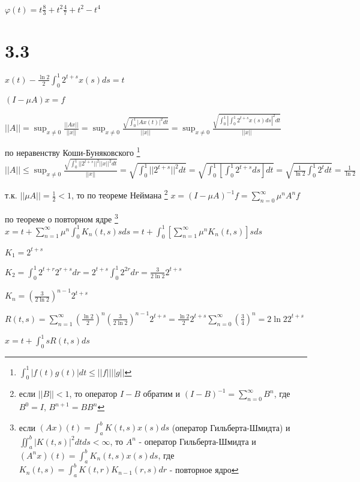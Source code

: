 \documentclass[russian]{article}
\begin{document}
$\varphi(t) = t \frac{8}{3} + t^2 \frac{4}{7} + t^2 - t^4$

\section*{3.3}

$x(t) - \frac{\ln 2}{2}\int_0^1 2^{t+s} x(s) ds = t$

$(I-\mu A)x = f$

$||A||=\sup_{x \ne 0} \frac{||Ax||}{||x||} = \sup_{x \ne 0} \frac{\sqrt{\int_0^1 |Ax(t)|^2 dt}}{||x||}=\sup_{x \ne 0} \frac{\sqrt{\int_0^1 |\int_0^1 2^{t+s}x(s)ds|^2 dt}}{||x||}$ 

по неравенству Коши-Буняковского \footnote{
	$\int_0^1|f(t) g(t)| dt \le ||f|| ||g|| $
}
$||A|| \le \sup_{x \ne 0} \frac{\sqrt{\int_0^1 ||2^{t+s}||^2 ||x||^2 dt}}{||x||} = \sqrt{\int_0^1 ||2^{t+s}||^2 dt} = \sqrt{\int_0^1 [\int_0^1 2^{t+s} ds]dt} =\sqrt{\frac{1}{\ln 2} \int_0^1 2^t dt} = \frac{1}{\ln 2}$

т.к. $||\mu A|| = \frac{1}{2} < 1$, то по теореме Неймана \footnote{
	если $||B|| < 1$, то оператор $I-B$ обратим и $(I-B)^{-1} = \sum _{n=0}^\infty B^n$, где $B^0 = I$, $B^{n+1} = B B^n$
}
$x=(I-\mu A)^{-1}f=\sum_{n=0}^{\infty}\mu^n A^n f$

по теореме о повторном ядре \footnote{
	если $(Ax)(t)=\int_a^bK(t,s)x(s)ds$ (оператор Гильберта-Шмидта)
	и $\iint_{a}^{b}|K(t,s)|^2 dt ds < \infty$, то $A^n$ - оператор Гильберта-Шмидта 
	и $(A^n x)(t) = \int_a^b K_n(t,s)x(s) ds$, где $K_n(t,s) = \int_a^b K(t,r) K_{n-1}(r,s)dr$ - повторное ядро
} $x=t + \sum_{n=1}^{\infty}\mu^n \int_0^1 K_n(t,s)s ds=t+\int_0^1[\sum_{n=1}^\infty \mu ^n K_n(t,s)]s ds$

$K_1 = 2^{t+s}$

$K_2 = \int_0^1 2^{t+r} 2^{r+s} dr = 2^{t+s} \int_0^1 2^{2r} dr = \frac{3}{2 \ln 2} 2^{t+s}$

$K_n = (\frac{3}{2 \ln 2})^{n-1} 2^{t+s} $

$R(t,s) = \sum_{n=1}^\infty (\frac{\ln 2}{2})^n (\frac{3}{2 \ln 2})^{n-1} 2^{t+s} = \frac{\ln 2}{2} 2^{t+s} \sum_{n=0}^\infty (\frac{3}{4})^n = 2 \ln 2 2^{t+s}$

$x=t+\int_0^1 s R(t,s) ds$
\end{document}
